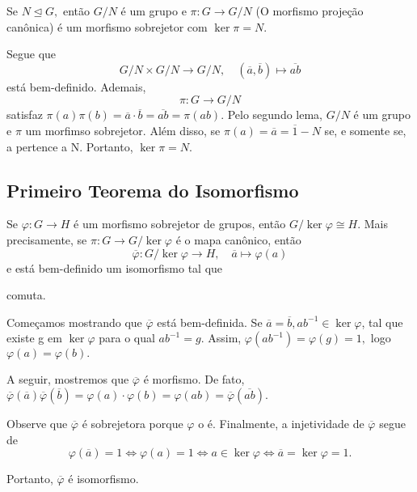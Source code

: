 \documentclass[algebra_notes.tex]{subfiles}
\begin{document}
\begin{theorem*}
	Se $N\trianglelefteq{G},$ então $G/N$ é um grupo e $\pi:G\rightarrow G/N$ (O morfismo projeção can\^onica) é um morfismo
	sobrejetor com $\ker{\pi}=N.$
\end{theorem*}
\begin{proof*}
	Segue que
	$$
		G/N\times G/N\rightarrow G/N,\quad (\overline{a}, \overline{b})\mapsto \overline{ab}
	$$
	está bem-definido. Ademais,
	$$
		\pi:G\rightarrow G/N
	$$
	satisfaz $\pi(a)\pi(b) = \overline{a}\cdot \overline{b}=\overline{ab}=\pi(ab).$ Pelo segundo lema, $G/N$ é um grupo
	e $\pi$ um morfimso sobrejetor. Além disso, se $\pi(a) = \overline{a} = \overline{1} - N$ se, e somente se, a pertence a N.
	Portanto, $\ker{\pi} = N.$ \qedsymbol
\end{proof*}
\subsection{Primeiro Teorema do Isomorfismo}
\begin{theorem*}
	Se $\varphi:G\rightarrow H$ é um morfismo sobrejetor de grupos, então $G/\ker{\varphi}\cong H.$ Mais precisamente, se
	$\pi:G\rightarrow G/\ker{\varphi}$ é o mapa can\^onico, então
	$$
		\overline{\varphi}:G/\ker{\varphi}\rightarrow H,\quad \overline{a}\mapsto \varphi(a)
	$$
	e está bem-definido um isomorfismo tal que

	\begin{center}
	\end{center}
	comuta.
\end{theorem*}
\begin{proof*}
	Começamos mostrando que $\overline{\varphi}$ está bem-definida. Se $\overline{a}=\overline{b}, ab^{-1}\in\ker{\varphi}$, tal que
	existe g em $\ker{\varphi}$ para o qual $ab^{-1}=g.$ Assim, $\varphi(ab^{-1})=\varphi(g)=1,$ logo $\varphi(a)=\varphi(b).$

	A seguir, mostremos que $\overline{\varphi}$ é morfismo. De fato, $\overline{\varphi}(\overline{a})\overline{\varphi}(\overline{b})
		= \varphi(a)\cdot \varphi(b) = \varphi(ab)=\overline{\varphi}(\overline{ab}).$

	Observe que $\overline{\varphi}$ é sobrejetora porque $\varphi$ o é. Finalmente, a injetividade de $\overline{\varphi}$ segue de
	$$
		\varphi(\overline{a})=1 \Longleftrightarrow \varphi(a)=1 \Longleftrightarrow a\in\ker{\varphi} \Longleftrightarrow \overline{a}=\ker{\varphi} = 1.
	$$

	Portanto, $\overline{\varphi}$ é isomorfismo. \qedsymbol
\end{proof*}
\end{document}
